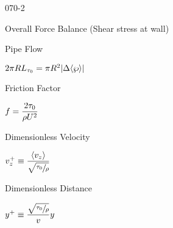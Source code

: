 \begin{mitframe}{070-2}
			
  
  \begin{listone}
  \item
  		\begin{listtwo}
        
       \item Overall Force Balance (Shear stress at wall)
        
      		\begin{listthree}
                \item Pipe Flow
                
                			\begin{listfour}
                            
                            \item $2\pi\gasconst\length_{\torque_{0}}=\pi\gasconst^2|\iipf\langle\dynpress\rangle|$
                            
                            \end{listfour}

					\item Friction Factor
                    
                    		\begin{listfour}
                            
                            \item $\fug=\dfrac{2\torque_0}{\dens\intenergy^2}$
                            
							\end{listfour}
                                        
				\end{listthree}

    	\item Dimensionless Velocity
        
       		\begin{listthree}
                
                \item $\vvel_{z}^+\equiv\dfrac{\langle\vvel_{z}\rangle}{\sqrt{\sfrac{\torque_{0}}{\dens}}}$
                
				\end{listthree}
                
        \item Dimensionless Distance
         
         		\begin{listthree}
                
                \item $y^+\equiv\dfrac{\sqrt{\sfrac{\torque_0}{\dens}}}{\vvel}y$
                

				\end{listthree}
		\end{listtwo}

\end{listone}
            


\end{mitframe}